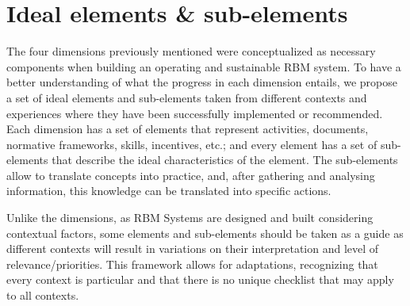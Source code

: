 \documentclass[
  10pt,
]{book}
\begin{document}
\hypertarget{ideal-elements-sub-elements}{%
\section{Ideal elements \& sub-elements}\label{ideal-elements-sub-elements}}

The four dimensions previously mentioned were conceptualized as necessary components when building an operating and sustainable RBM system. To have a better understanding of what the progress in each dimension entails, we propose a set of ideal elements and sub-elements taken from different contexts and experiences where they have been successfully implemented or recommended. Each dimension has a set of elements that represent activities, documents, normative frameworks, skills, incentives, etc.; and every element has a set of sub-elements that describe the ideal characteristics of the element. The sub-elements allow to translate concepts into practice, and, after gathering and analysing information, this knowledge can be translated into specific actions.

Unlike the dimensions, as RBM Systems are designed and built considering contextual factors, some elements and sub-elements should be taken as a guide as different contexts will result in variations on their interpretation and level of relevance/priorities. This framework allows for adaptations, recognizing that every context is particular and that there is no unique checklist that may apply to all contexts.
\end{document}
